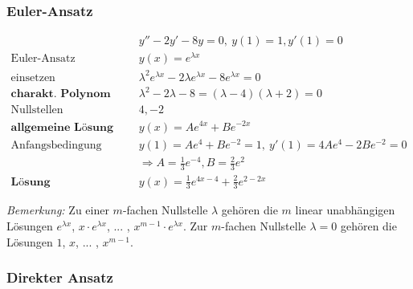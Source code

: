 \documentclass[11pt]{article}
\begin{document}
%

\subsubsection{Euler-Ansatz}

\begin{equation*}
\begin{split}
	& y'' - 2y' - 8y = 0,\ y(1) = 1, y'(1) = 0 \\
	\text{Euler-Ansatz}\quad & y(x) = e^{\lambda x} \\
	\text{einsetzen}\quad & \lambda^2 e^{\lambda x} - 2\lambda e^{\lambda x} - 8e^{\lambda x} = 0 \\
	\textbf{charakt. Polynom}\quad & \lambda^2 - 2\lambda - 8 = (\lambda - 4)(\lambda + 2) = 0 \\
	\text{Nullstellen}\quad & 4, -2 \\
	\textbf{allgemeine L{\"o}sung}\quad & y(x) = Ae^{4x} + Be^{-2x} \\
	\text{Anfangsbedingung gebrauchen}\quad & y(1) = Ae^4 + Be^{-2} = 1,\ y'(1) = 4Ae^4 - 2Be^{-2} = 0 \\
											& \Rightarrow A = \frac{1}{3}e^{-4}, B = \frac{2}{3}e^2 \\
	\textbf{L{\"o}sung}\quad & y(x) = \frac{1}{3}e^{4x-4} + \frac{2}{3}e^{2-2x}
\end{split}
\end{equation*}

\emph{Bemerkung:} Zu einer $m$-fachen Nullstelle $\lambda$ geh{\"o}ren die $m$ linear unabh{\"a}ngigen L{\"o}sungen $e^{\lambda x}$, $x\cdot e^{\lambda x}$, ... , $x^{m-1}\cdot e^{\lambda x}$. Zur $m$-fachen Nullstelle $\lambda = 0$ geh{\"o}ren die L{\"o}sungen $1$, $x$, ... , $x^{m-1}$.

\subsubsection{Direkter Ansatz}
\end{document}
